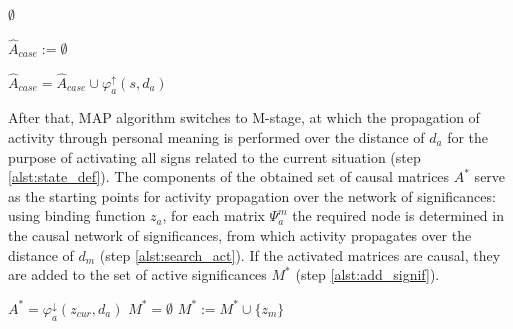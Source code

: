\documentclass[review]{elsarticle}
\begin{document}
\begin{algorithm}
	\begin{algorithmic}[1]
			\label{alst:exit}
			\State\Return $\emptyset$
			\EndIf
			
			\State $\hat A_{case}:=\emptyset$ 
			
			\Statex{}
			\Statex{}
			
			 \label{alst:check_wm}
			\label{alst:check_a}
			\State $\hat A_{case} = \hat A_{case} \cup \varphi_a^\uparrow(s,d_a)$ \label{alst:search_case}
			\EndIf
			\EndFor
			\EndFor
	\end{algorithmic}
\end{algorithm}

After that, MAP algorithm switches to M-stage, at which the propagation of activity through personal meaning is performed over the distance of $d_a$ for the purpose of activating all signs related to the current situation (step \ref{alst:state_def}). The components of the obtained set of causal matrices $A^*$ serve as the starting points for activity propagation over the network of significances: using binding function $z_a$, for each matrix $\Psi_a^m$ the required node is determined in the causal network of significances, from which activity propagates over the distance of $d_m$ (step \ref{alst:search_act}). If the activated matrices are causal, they are added to the set of active significances $M^*$ (step \ref{alst:add_signif}).

\begin{algorithm}
	\begin{algorithmic}[1]
		\Statex{}
		\Statex{}
		\State $A^* = \varphi_a^\downarrow(z_{cur}, d_a)$\label{alst:state_def}
		\State $M^*=\emptyset$
		\Statex{}
		 \label{alst:search_act}
		\State $M^* := M^*\cup\{z_m\}$ \label{alst:add_signif}
		\EndIf
		\EndFor
		\EndFor
	\end{algorithmic}
\end{algorithm}
\end{document}
